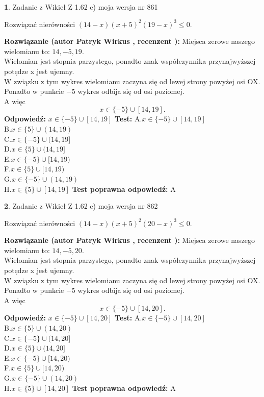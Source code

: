 \documentclass[12pt, a4paper]{article}
\theoremstyle{definition} %
\newtheorem{zad}{}
\newcommand{\zadStart}[1]{\begin{zad}#1\newline}
\newcommand{\zadStop}{\end{zad}}
\newcommand{\rozwStart}[2]{\noindent \textbf{Rozwiązanie (autor #1 , recenzent #2): }\newline}
\newcommand{\rozwStop}{\newline}
\newcommand{\odpStart}{\noindent \textbf{Odpowiedź:}\newline}
\newcommand{\odpStop}{\newline}
\newcommand{\testStart}{\noindent \textbf{Test:}\newline}
\newcommand{\testStop}{\newline}
\newcommand{\kluczStart}{\noindent \textbf{Test poprawna odpowiedź:}\newline}
\newcommand{\kluczStop}{\newline}
\begin{document}
\zadStart{Zadanie z Wikieł Z 1.62 c) moja wersja nr 861}

Rozwiązać nierówności $(14-x)(x+5)^{2}(19-x)^{3}\le0$.
\zadStop
\rozwStart{Patryk Wirkus}{}
Miejsca zerowe naszego wielomianu to: $14, -5, 19$.\\
Wielomian jest stopnia parzystego, ponadto znak współczynnika przy\linebreak najwyższej potędze x jest ujemny.\\ W związku z tym wykres wielomianu zaczyna się od lewej strony powyżej osi OX.\\
Ponadto w punkcie $-5$ wykres odbija się od osi poziomej.\\
A więc $$x \in \{-5\} \cup [14,19].$$
\rozwStop
\odpStart
$x \in \{-5\} \cup [14,19]$
\odpStop
\testStart
A.$x \in \{-5\} \cup [14,19]$\\
B.$x \in \{5\} \cup (14,19)$\\
C.$x \in \{-5\} \cup (14,19]$\\
D.$x \in \{5\} \cup (14,19]$\\
E.$x \in \{-5\} \cup [14,19)$\\
F.$x \in \{5\} \cup [14,19)$\\
G.$x \in \{-5\} \cup (14,19)$\\
H.$x \in \{5\} \cup [14,19]$
\testStop
\kluczStart
A
\kluczStop



\zadStart{Zadanie z Wikieł Z 1.62 c) moja wersja nr 862}

Rozwiązać nierówności $(14-x)(x+5)^{2}(20-x)^{3}\le0$.
\zadStop
\rozwStart{Patryk Wirkus}{}
Miejsca zerowe naszego wielomianu to: $14, -5, 20$.\\
Wielomian jest stopnia parzystego, ponadto znak współczynnika przy\linebreak najwyższej potędze x jest ujemny.\\ W związku z tym wykres wielomianu zaczyna się od lewej strony powyżej osi OX.\\
Ponadto w punkcie $-5$ wykres odbija się od osi poziomej.\\
A więc $$x \in \{-5\} \cup [14,20].$$
\rozwStop
\odpStart
$x \in \{-5\} \cup [14,20]$
\odpStop
\testStart
A.$x \in \{-5\} \cup [14,20]$\\
B.$x \in \{5\} \cup (14,20)$\\
C.$x \in \{-5\} \cup (14,20]$\\
D.$x \in \{5\} \cup (14,20]$\\
E.$x \in \{-5\} \cup [14,20)$\\
F.$x \in \{5\} \cup [14,20)$\\
G.$x \in \{-5\} \cup (14,20)$\\
H.$x \in \{5\} \cup [14,20]$
\testStop
\kluczStart
A
\kluczStop
\end{document}
